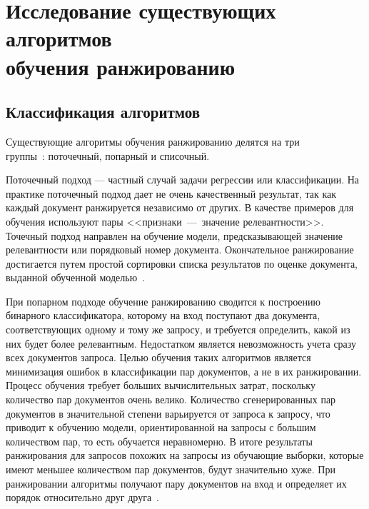 \chapter[Исследование существующих алгоритмов обучения\\ранжированию]{Исследование существующих алгоритмов \\обучения ранжированию}

\section{Классификация алгоритмов}

Существующие алгоритмы обучения ранжированию делятся на три \\ группы~\cite{ML_for_rank}: поточечный, попарный и списочный.

Поточечный подход --- частный случай задачи регрессии или классификации. На практике поточечный подход дает не очень качественный результат, так как каждый документ ранжируется независимо от других. В качестве примеров для обучения используют пары <<признаки~---~значение релевантности>>. Точечный подход направлен на обучение модели, предсказывающей значение релевантности или порядковый номер документа. Окончательное ранжирование достигается путем простой сортировки списка результатов по оценке документа, выданной обученной моделью~\cite{ML_for_SE}.

При попарном подходе обучение ранжированию сводится к построению бинарного классификатора, которому на вход поступают два документа, соответствующих одному и тому же запросу, и требуется определить, какой из них будет более релевантным. Недостатком  является невозможность учета сразу всех документов запроса. Целью обучения таких алгоритмов является минимизация ошибок в классификации пар документов, а не в их ранжировании. Процесс обучения требует больших вычислительных затрат, поскольку количество пар документов очень велико. Количество сгенерированных пар документов в значительной степени варьируется от запроса к запросу, что приводит к обучению модели, ориентированной на запросы с большим количеством пар, то есть обучается неравномерно. В итоге результаты ранжирования для запросов похожих на запросы из обучающие выборки, которые имеют меньшее количеством пар документов, будут значительно хуже. При ранжировании алгоритмы получают пару документов на вход и определяет их порядок относительно друг друга~\cite{ML_for_SE}.

